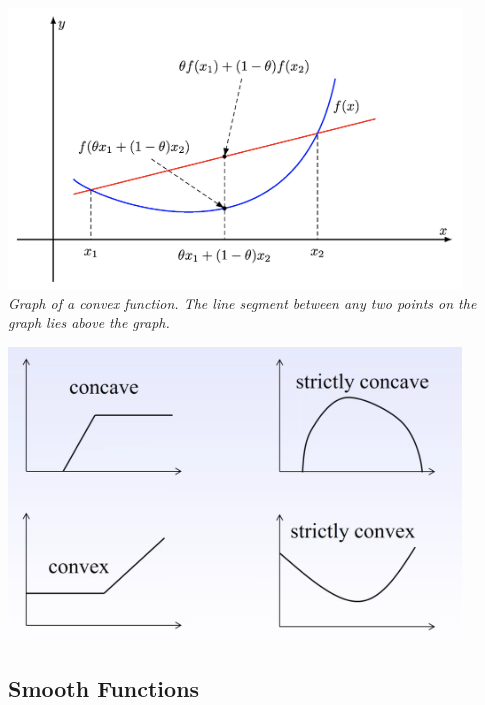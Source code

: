 \documentclass{article}
\begin{document}
\begin{itemize}
\begin{itemize}
    \end{itemize}
    \begin{center}
        \includegraphics[width=0.9\textwidth]{imgs/convex_function.png} \\
        \textit{Graph of a convex function. The line segment between any two
        points on the graph lies above the graph.}
    \end{center}
    \begin{center}
        \includegraphics[width=0.9\textwidth]{imgs/concave_convex_graphs.png} \\
    \end{center}
\end{itemize}

\subsection{Smooth Functions}
\end{document}

